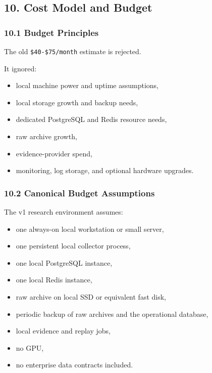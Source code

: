 \documentclass[
]{article}
\providecommand{\tightlist}{%
  \setlength{\itemsep}{0pt}\setlength{\parskip}{0pt}}
\begin{document}
\subsection{10. Cost Model and Budget}\label{10-cost-model-and-budget}

\subsubsection{10.1 Budget Principles}\label{101-budget-principles}

The old \texttt{\$40-\$75/month} estimate is rejected.

It ignored:

\begin{itemize}
\tightlist
\item
  local machine power and uptime assumptions,
\item
  local storage growth and backup needs,
\item
  dedicated PostgreSQL and Redis resource needs,
\item
  raw archive growth,
\item
  evidence-provider spend,
\item
  monitoring, log storage, and optional hardware upgrades.
\end{itemize}

\subsubsection{10.2 Canonical Budget
Assumptions}\label{102-canonical-budget-assumptions}

The v1 research environment assumes:

\begin{itemize}
\tightlist
\item
  one always-on local workstation or small server,
\item
  one persistent local collector process,
\item
  one local PostgreSQL instance,
\item
  one local Redis instance,
\item
  raw archive on local SSD or equivalent fast disk,
\item
  periodic backup of raw archives and the operational database,
\item
  local evidence and replay jobs,
\item
  no GPU,
\item
  no enterprise data contracts included.
\end{itemize}
\end{document}
